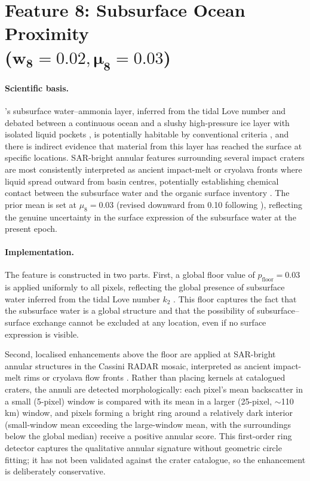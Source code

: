 \section[Feature 8: Subsurface Ocean Proximity
  ($w_8 = 0.02$, $\mu_8 = 0.03$)]{Feature 8: Subsurface Ocean Proximity \\
  ($\boldsymbol{w_8 = 0.02, \mu_8 = 0.03}$)}
\label{sec:feat_ocean}

\paragraph{Scientific basis.}
\titan{}'s subsurface water--ammonia layer, inferred from the tidal Love
number \citep{Iess2012} and debated between a continuous ocean and a slushy
high-pressure ice layer with isolated liquid pockets \citep{Petricca2025}, is
potentially habitable by conventional criteria \citep{Affholder2025}, and
there is indirect evidence that material from this layer has reached the
surface at specific locations.  SAR-bright annular features surrounding
several impact craters are most consistently interpreted as ancient
impact-melt or cryolava fronts where liquid spread outward from basin centres,
potentially establishing chemical contact between the subsurface water and
the organic surface inventory \citep{Wood2010}.  The prior mean is set at
$\mu_8 = 0.03$ (revised downward from 0.10 following \citet{Neish2024b}),
reflecting the genuine uncertainty in the surface expression of the
subsurface water at the present epoch.

\paragraph{Implementation.}
The feature is constructed in two parts.  First, a global floor value of
$p_\text{floor} = 0.03$ is applied uniformly to all pixels, reflecting the
global presence of subsurface water inferred from the tidal Love number
$k_2$ \citep{Iess2012}.  This floor captures the fact that the subsurface
water is a global structure and that the possibility of subsurface--surface exchange cannot
be excluded at any location, even if no surface expression is visible.

Second, localised enhancements above the floor are applied at SAR-bright
annular structures in the Cassini RADAR mosaic, interpreted as ancient
impact-melt rims or cryolava flow fronts \citep{Wood2010}.  Rather than
placing kernels at catalogued craters, the annuli are detected
morphologically: each pixel's mean backscatter in a small (5-pixel) window
is compared with its mean in a larger (25-pixel, $\sim$110\,km) window, and
pixels forming a bright ring around a relatively dark interior (small-window
mean exceeding the large-window mean, with the surroundings below the global
median) receive a positive annular score.  This first-order ring detector
captures the qualitative annular signature without geometric circle fitting;
it has not been validated against the \citet{Hedgepeth2020} crater catalogue,
so the enhancement is deliberately conservative.

